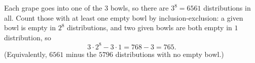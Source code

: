 Each grape goes into one of the $3$ bowls, so there are $3^8=6561$ distributions in all. Count those with at least one empty bowl by inclusion-exclusion: a given bowl is empty in $2^8$ distributions, and two given bowls are both empty in $1$ distribution, so
\[3\cdot2^8-3\cdot1=768-3=\boxed{765}.\]
(Equivalently, $6561$ minus the $5796$ distributions with no empty bowl.)
